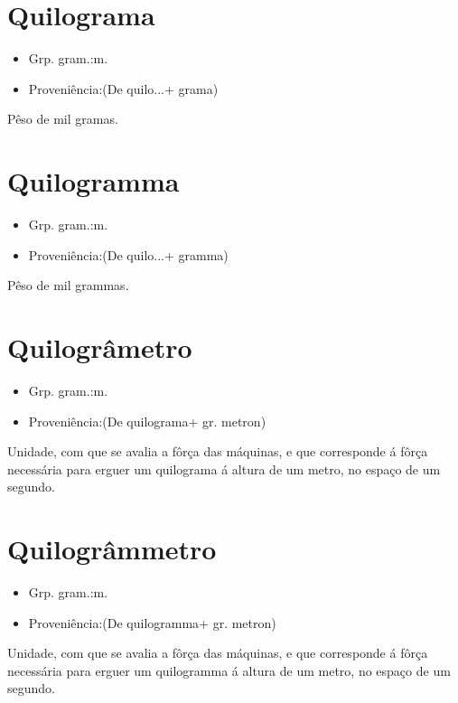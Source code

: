 \section{Quilograma}
\begin{itemize}
\item {Grp. gram.:m.}
\end{itemize}
\begin{itemize}
\item {Proveniência:(De \textunderscore quilo...\textunderscore  + \textunderscore grama\textunderscore )}
\end{itemize}
Pêso de mil gramas.
\section{Quilogramma}
\begin{itemize}
\item {Grp. gram.:m.}
\end{itemize}
\begin{itemize}
\item {Proveniência:(De \textunderscore quilo...\textunderscore  + \textunderscore gramma\textunderscore )}
\end{itemize}
Pêso de mil grammas.
\section{Quilogrâmetro}
\begin{itemize}
\item {Grp. gram.:m.}
\end{itemize}
\begin{itemize}
\item {Proveniência:(De \textunderscore quilograma\textunderscore  + gr. \textunderscore metron\textunderscore )}
\end{itemize}
Unidade, com que se avalia a fôrça das máquinas, e que corresponde á fôrça necessária para erguer um quilograma á altura de um metro, no espaço de um segundo.
\section{Quilogrâmmetro}
\begin{itemize}
\item {Grp. gram.:m.}
\end{itemize}
\begin{itemize}
\item {Proveniência:(De \textunderscore quilogramma\textunderscore  + gr. \textunderscore metron\textunderscore )}
\end{itemize}
Unidade, com que se avalia a fôrça das máquinas, e que corresponde á fôrça necessária para erguer um quilogramma á altura de um metro, no espaço de um segundo.
